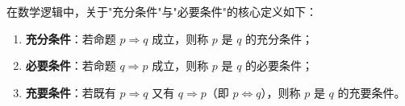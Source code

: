 \begin{statementbox}
在数学逻辑中，关于"充分条件"与"必要条件"的核心定义如下：
\begin{enumerate}
    \item \textbf{充分条件}：若命题 $p \Rightarrow q$ 成立，则称 $p$ 是 $q$ 的充分条件；
    \item \textbf{必要条件}：若命题 $q \Rightarrow p$ 成立，则称 $p$ 是 $q$ 的必要条件；
    \item \textbf{充要条件}：若既有 $p \Rightarrow q$ 又有 $q \Rightarrow p$（即 $p \Leftrightarrow q$），则称 $p$ 是 $q$ 的充要条件。
\end{enumerate}
\end{statementbox}
